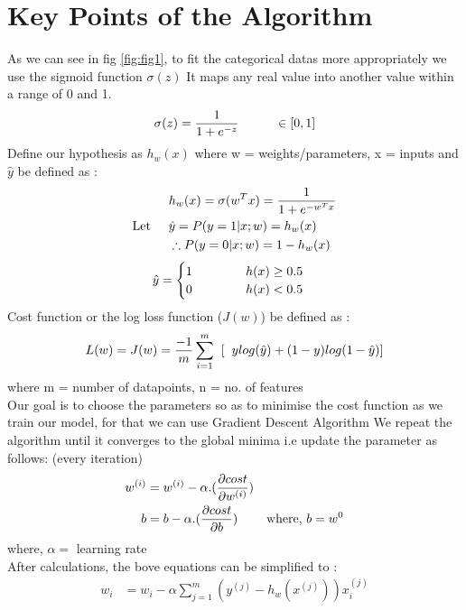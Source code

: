 \documentclass[a4paper, 11pt]{article}
\begin{document}
\section{Key Points of the Algorithm}
As we can see in fig \ref{fig:fig1}, to fit the categorical datas more appropriately we use the sigmoid function $\sigma(z)$
It maps any real value into another value within a range of 0 and 1.
\begin{align}
    \sigma(z) = \frac{1}{1+e^{-z}} \hspace{10mm}\in[0,1]
\end{align}
Define our hypothesis as $h_w(x)$ where w = weights/parameters, x = inputs and $\hat{y}$ be defined as :
\begin{align}
    &h_w(x) = \sigma(w^Tx) = \frac{1}{1+e^{-w^Tx}}\\
   \text{Let} \hspace{5mm}&\hat{y} = P(y=1|x;w) = h_w(x)  \\
    &\therefore P(y=0|x;w) = 1 - h_w(x) 
\end{align}
\begin{align}
    \hat{y} =
    \begin{cases}
        1\hspace{15mm} h(x) \ge 0.5 \\
        0 \hspace{15mm} h(x) < 0.5
    \end{cases}
\end{align}
 Cost function or the log loss function ($J(w)$) be defined as :\\
\begin{align}
    L(w) = J(w) = \frac{-1}{m} \sum_{i=1}^{m} \hspace{2mm}[\hspace{2mm}y log (\hat{y}) + (1-y)log(1-\hat{y})]
\end{align}
where m = number of datapoints, n = no. of features \\
Our goal is to choose the parameters so as to minimise the cost function as we train our model, for that we can use Gradient Descent Algorithm
We repeat the algorithm until it converges to the global minima i.e update the parameter as follows: (every iteration)
\begin{align}
    w^{(i)} &= w^{(i)} - \alpha .(\diffp{cost}{w^{(i)}})\\
    b &= b - \alpha .(\diffp{cost}{b}) \hspace{8mm} \text{where,  } b = w^0
\end{align}
where, $\alpha =$ learning rate\\
After calculations, the bove equations can be simplified to :
\begin{align}
    w_i &= w_i - \alpha \sum_{j=1}^{m}(y^{(j)} - h_w(x^{(j)}))x_i^{(j)}\\
\end{align}
\end{document}
